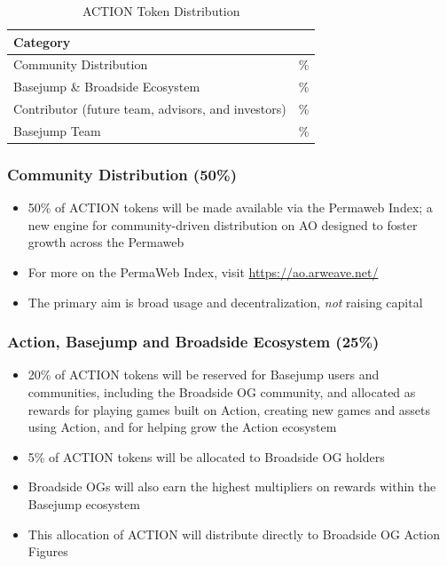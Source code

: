 \begin{table}
  \centering
  \renewcommand{\arraystretch}{1.2}
  \caption{ACTION Token Distribution\protect\footnotemark}
  \begin{tabularx}{\columnwidth}{>{\raggedright\arraybackslash}p{}>{\raggedleft\arraybackslash}p{}}
  \hline
  \textbf{Category} & \multicolumn{1}{>{\raggedleft\arraybackslash}p{0.2\columnwidth}}{\textbf{Allocation}} \\
  \hline
  Community Distribution & 50\% \\
  Basejump \& Broadside Ecosystem & 25\% \\
  Contributor (future team, advisors, and investors) & 20\% \\
  Basejump Team & 5\% \\
  \hline
  \end{tabularx}
\end{table}

\subsubsection{Community Distribution (50\%)}
\begin{itemize}
\item 50\% of ACTION tokens will be made available via the Permaweb Index; a new engine for community-driven distribution on AO designed to foster growth across the Permaweb
\item For more on the PermaWeb Index, visit \url{https://ao.arweave.net/}
\item The primary aim is broad usage and decentralization, \textit{not} raising capital
\end{itemize}

\subsubsection{Action, Basejump and Broadside Ecosystem (25\%)}
\begin{itemize}
\item 20\% of ACTION tokens will be reserved for Basejump users and communities, including the Broadside OG community, and allocated as rewards for playing games built on Action, creating new games and assets using Action, and for helping grow the Action ecosystem
\item 5\% of ACTION tokens will be allocated to Broadside OG holders
\item Broadside OGs will also earn the highest multipliers on rewards within the Basejump ecosystem
\item This allocation of ACTION will distribute directly to Broadside OG Action Figures
\end{itemize}

